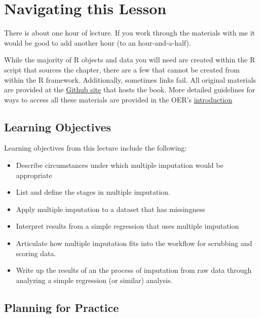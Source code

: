 \documentclass[
  11pt,
]{book}
\providecommand{\tightlist}{%
  \setlength{\itemsep}{0pt}\setlength{\parskip}{0pt}}
\begin{document}
\hypertarget{navigating-this-lesson-3}{%
\section{Navigating this Lesson}\label{navigating-this-lesson-3}}

There is about one hour of lecture. If you work through the materials with me it would be good to add another hour (to an hour-and-a-half).

While the majority of R objects and data you will need are created within the R script that sources the chapter, there are a few that cannot be created from within the R framework. Additionally, sometimes links fail. All original materials are provided at the \href{https://github.com/lhbikos/ReC_MultivModel}{Github site} that hosts the book. More detailed guidelines for ways to access all these materials are provided in the OER's \protect\hyperlink{ReCintro}{introduction}

\hypertarget{learning-objectives-3}{%
\subsection{Learning Objectives}\label{learning-objectives-3}}

Learning objectives from this lecture include the following:

\begin{itemize}
\tightlist
\item
  Describe circumstances under which multiple imputation would be appropriate
\item
  List and define the stages in multiple imputation.
\item
  Apply multiple imputation to a dataset that has missingness
\item
  Interpret results from a simple regression that uses multiple imputation
\item
  Articulate how multiple imputation fits into the workflow for scrubbing and scoring data.
\item
  Write up the results of an the process of imputation from raw data through analyzing a simple regression (or similar) analysis.
\end{itemize}

\hypertarget{planning-for-practice-3}{%
\subsection{Planning for Practice}\label{planning-for-practice-3}}
\end{document}
